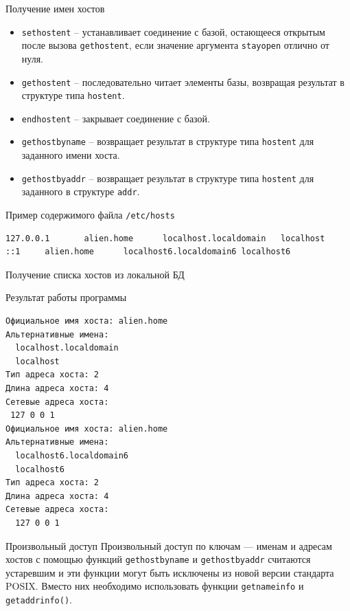\begin{frame}[fragile]{Получение имен хостов}

\begin{itemize}
	\item {\tt sethostent} -- устанавливает соединение с базой, остающееся открытым после вызова {\tt gethostent}, если значение аргумента {\tt stayopen} отлично от нуля.
	\item {\tt gethostent} -- последовательно читает элементы базы, возвращая результат в структуре типа {\tt hostent}.
	\item {\tt endhostent} -- закрывает соединение с базой.
	\item {\tt gethostbyname} -- возвращает результат в структуре типа {\tt hostent} для заданного имени хоста.
	\item {\tt gethostbyaddr} -- возвращает результат в структуре типа {\tt hostent} для заданного в структуре {\tt addr}.	
\end{itemize}
\end{frame}

\begin{frame}[fragile]{Пример содержимого файла {\tt /etc/hosts}}
\scriptsize
\begin{verbatim}
127.0.0.1       alien.home      localhost.localdomain   localhost
::1     alien.home      localhost6.localdomain6 localhost6
\end{verbatim}
\normalsize
\end{frame}

\begin{frame}[fragile]{Получение списка хостов из локальной БД}
\tiny
\end{frame}

\begin{frame}[fragile]{Результат работы программы}
\scriptsize
\begin{verbatim}
Официальное имя хоста: alien.home
Альтернативные имена:
  localhost.localdomain
  localhost
Тип адреса хоста: 2
Длина адреса хоста: 4
Сетевые адреса хоста:
 127 0 0 1
Официальное имя хоста: alien.home
Альтернативные имена:
  localhost6.localdomain6
  localhost6
Тип адреса хоста: 2
Длина адреса хоста: 4
Сетевые адреса хоста:
  127 0 0 1
\end{verbatim}
\normalsize
\end{frame}

\begin{frame}{Произвольный доступ}
Произвольный доступ по ключам --- именам и адресам хостов с помощью функций {\tt gethostbyname} и {\tt gethostbyaddr} считаются устаревшим и эти функции могут быть исключены из новой версии стандарта POSIX. Вместо них необходимо использовать функции {\tt getnameinfo} и {\tt getaddrinfo()}.
\end{frame}

